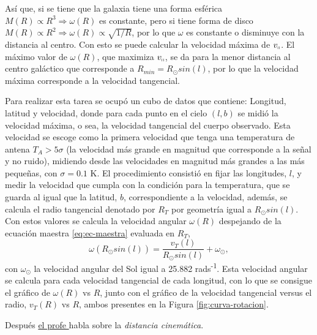 \documentclass[letterpaper,oneside]{article}
\begin{document}
Así que, si se tiene que la galaxia tiene una forma esférica $M(R) \propto R^3\Rightarrow\omega(R)$ es constante, pero si tiene forma de disco $M(R) \propto R^2\Rightarrow\omega(R)\propto \sqrt{1/R}$, por lo que $\omega$ es constante o disminuye con la distancia al centro. Con esto se puede calcular la velocidad máxima de $v_{\shortparallel}$. El máximo valor de  $\omega(R)$, que maximiza $v_{\shortparallel}$, se da para la menor distancia al centro galáctico que corresponde a $R_{min}=R_{\odot}sin(l)$, por lo que la velocidad máxima corresponde a la velocidad tangencial.


Para realizar esta tarea se ocupó un cubo de datos que contiene: Longitud, latitud y velocidad, donde para cada punto en el cielo $(l,b)$ se midió la velocidad máxima, o sea, la velocidad tangencial del cuerpo observado. Esta velocidad se escoge como la primera velocidad que tenga una temperatura de antena $T_A>5\sigma$ (la velocidad más grande en magnitud que corresponde a la señal y no ruido), midiendo desde las velocidades en magnitud más grandes a las más pequeñas, con $\sigma =0.1$ \si{\kelvin}. El procedimiento consistió en fijar las longitudes, $l$, y medir la velocidad que cumpla con la condición para la temperatura, que se guarda al igual que la latitud, $b$, correspondiente a la velocidad, además, se calcula el radio tangencial denotado por $R_T$ por geometría igual a $R_{\odot}sin(l)$. Con estos valores se calcula la velocidad angular $\omega(R)$ despejando de la ecuación maestra \ref{eq:ec-maestra} evaluada en $R_T$,
\begin{equation*}
\omega(R_{\odot}sin(l))=\frac{v_T(l)}{R_{\odot}sin(l)}+\omega_{\odot},
\end{equation*}
con $\omega_{\odot}$ la velocidad angular del Sol igual a 25.882 rads\textsuperscript{-1}. Esta velocidad angular se calcula para cada velocidad tangencial de cada longitud, con lo que se consigue el gráfico de $\omega(R)$ vs $R$, junto con el gráfico de la velocidad tangencial versus el radio, $v_T(R)$ vs $R$, ambos presentes en la Figura \ref{fig:curva-rotacion}.

Después \href{https://www.youtube.com/watch?v=8ISCwe7OM-8}{el profe }habla sobre la \textit{distancia cinemática}.
\end{document}
